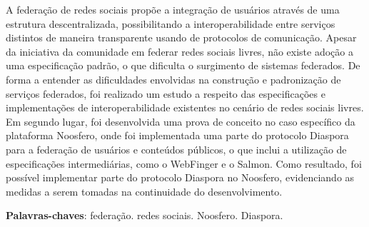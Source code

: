 \begin{resumo}
  A federação de redes sociais propõe a integração de usuários através de uma
  estrutura descentralizada, possibilitando a interoperabilidade entre serviços
  distintos de maneira transparente usando de protocolos de comunicação. Apesar da
  iniciativa da comunidade em federar redes sociais livres, não existe adoção a uma
  especificação padrão, o que dificulta o surgimento de sistemas federados. De forma
  a entender as dificuldades envolvidas na construção e padronização de serviços
  federados, foi realizado um estudo a respeito das especificações e implementações
  de interoperabilidade existentes no cenário de redes sociais livres. Em segundo
  lugar, foi desenvolvida uma prova de conceito no caso específico da plataforma
  Noosfero, onde foi implementada uma parte do protocolo Diaspora para a federação
  de usuários e conteúdos públicos, o que inclui a utilização de especificações
  intermediárias, como o WebFinger e o Salmon. Como resultado, foi possível
  implementar parte do protocolo Diaspora no Noosfero, evidenciando as medidas a
  serem tomadas na continuidade do desenvolvimento.

  \vspace{\onelineskip}

  \noindent
  \textbf{Palavras-chaves}: federação. redes sociais. Noosfero. Diaspora.
\end{resumo}
